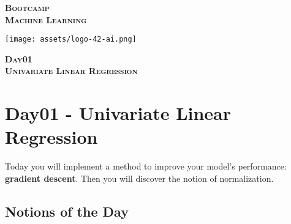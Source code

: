 \documentclass[]{article}
\date{}
\begin{document}

\vspace*{2cm}
\begin{center}
    \textsc{\fontsize{40}{48} \bfseries Bootcamp}\\[0.6cm]
    \textsc{\fontsize{39}{48} \bfseries { %
Machine Learning
    }}\\[0.3cm]
\end{center}
\vspace{3cm}

\begin{center}
\texttt{[image: assets/logo-42-ai.png]}{\centering}
\end{center}

\vspace*{2cm}
\begin{center}
    \textsc{\fontsize{32}{48} \bfseries %
Day01    
    }\\[0.6cm]
    \textsc{\fontsize{32}{48} \bfseries %
Univariate Linear Regression    
    }\\[0.3cm]
\end{center}
\vspace{3cm}

\newpage

\setcounter{page}{1}



\hypertarget{day01---univariate-linear-regression}{%
\section{Day01 - Univariate Linear
Regression}\label{day01---univariate-linear-regression}}

Today you will implement a method to improve your model's performance:
\textbf{gradient descent}. Then you will discover the notion of
normalization.

\hypertarget{notions-of-the-day}{%
\subsection{Notions of the Day}\label{notions-of-the-day}}
\end{document}
